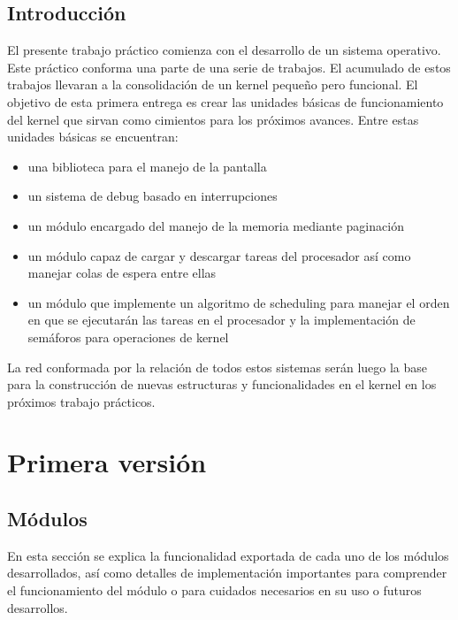 \documentclass[a4paper]{article}
\begin{document}
\maketitle
\tableofcontents
\newpage

\section{Introducción}
El presente trabajo práctico comienza con el desarrollo de un sistema operativo. Este práctico conforma una parte de una serie de trabajos. El acumulado de estos trabajos llevaran a la consolidación de un kernel pequeño pero funcional. El objetivo de esta primera entrega es crear las unidades básicas de funcionamiento del kernel que sirvan como cimientos para los próximos avances. Entre estas unidades básicas se encuentran: 

\begin{itemize}
  \item una biblioteca para el manejo de la pantalla
  \item un sistema de debug basado en interrupciones
  \item un módulo encargado del manejo de la memoria mediante paginación
  \item un módulo capaz de cargar y descargar tareas del procesador así como manejar colas de espera entre ellas
  \item un módulo que implemente un algoritmo de scheduling para manejar el orden en que se ejecutarán las tareas en el procesador y la implementación de semáforos para operaciones de kernel
\end{itemize}

La red conformada por la relación de todos estos sistemas serán luego la base para la construcción de nuevas estructuras y funcionalidades en el kernel en los próximos trabajo prácticos. 

\newpage
\chapter{Primera versión}

\section{Módulos}

En esta sección se explica la funcionalidad exportada de cada uno de los módulos desarrollados, así como detalles de implementación importantes para comprender el funcionamiento del módulo o para cuidados necesarios en su uso o futuros desarrollos. 
\end{document}
